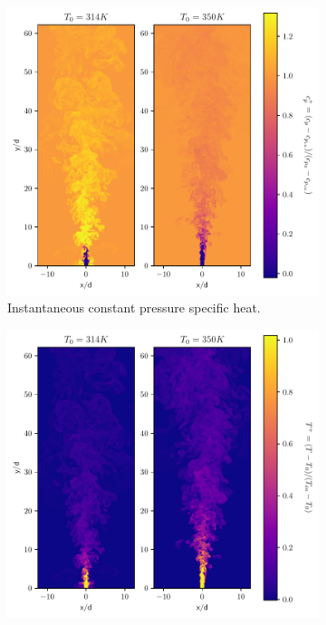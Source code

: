 \begin{figure}[H]
\begin{subfigure}{0.5\textwidth}
	\centering
	\includegraphics[scale=.45]{figures/Plots/vertical/cp_scaled_vert_noniso.pdf}
	\caption{Instantaneous constant pressure specific heat.} \label{noniso_cp_1}
\end{subfigure}
\hfill
\begin{subfigure}{0.5\textwidth}
	\centering
	\includegraphics[scale=.45]{figures/Plots/vertical/temp_scaled_vert_noniso.pdf}

\end{subfigure}
\end{figure}
